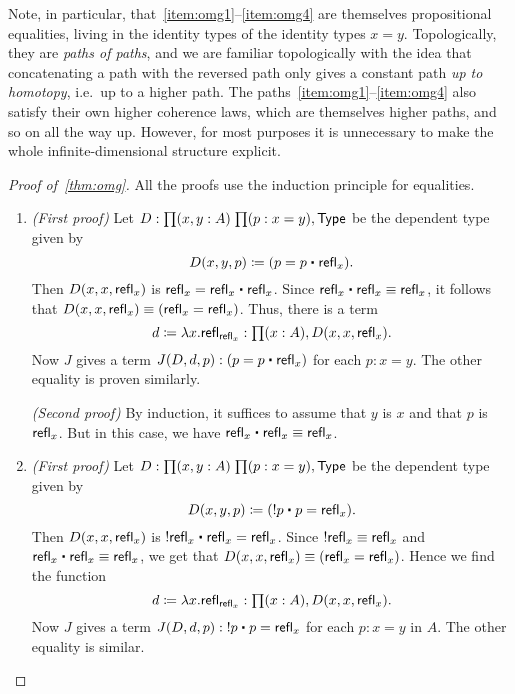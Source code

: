 Note, in particular, that~\ref{item:omg1}--\ref{item:omg4} are themselves propositional equalities, living in the identity types of the identity types $x=y$.
Topologically, they are \emph{paths of paths}, and we are familiar topologically with the idea that concatenating a path with the reversed path only gives a constant path \emph{up to homotopy}, i.e.\ up to a higher path.
The paths~\ref{item:omg1}--\ref{item:omg4} also satisfy their own higher coherence laws, which are themselves higher paths, and so on all the way up.
However, for most purposes it is unnecessary to make the whole infinite-dimensional structure explicit.

\begin{proof}[Proof of~\autoref{thm:omg}]
  All the proofs use the induction principle for equalities.
  \begin{enumerate}
  \item \emph{(First proof)} Let $D:\prd{x,y:A}{p:x=y} \type$ be the dependent type given by 
    \begin{equation*}
      D(x,y,p)\defeq (p= p\ct \refl{x}).
    \end{equation*}
    Then $D(x,x,\mathsf{refl}_{x})$ is $\refl{x}=\refl{x}\ct\refl{x}$.
    Since $\refl{x}\ct\refl{x}\jdeq\refl{x}$, it follows that $D(x,x,\mathsf{refl}_{x})\equiv (\mathsf{refl}_{x}=\mathsf{refl}_{x})$.
    Thus, there is a term
    \begin{equation*}
      d\defeq\lambda x.\refl{\refl{x}}:\prd{x:A} D(x,x,\refl{x}).
    \end{equation*}
    Now $J$ gives a term $J(D,d,p):(p= p\ct\refl{x})$ for each $p:x= y$.
    The other equality is proven similarly.

    \noindent
    \emph{(Second proof)} By induction, it suffices to assume that $y$ is $x$ and that $p$ is $\mathsf{refl}_{x}$.
    But in this case, we have $\refl{x}\ct\refl{x}\jdeq\refl{x}$.
  \item \emph{(First proof)} Let $D:\prd{x,y:A}{p:x=y} \type$ be the dependent type given by 
    \begin{equation*}
      D(x,y,p)\defeq (\opp{p}\ct p=  \refl{x}).
    \end{equation*}
    Then $D(x,x,\mathsf{refl}_{x})$ is $\opp{\refl{x}}\ct\refl{x}=\refl{x}$.
    Since $\mathord{!{\mathsf{refl}_{x}}}\equiv\mathsf{refl}_{x}$ and $\refl{x}\ct\refl{x}\jdeq\refl{x}$, we get that $D(x,x,\mathsf{refl}_{x})\equiv (\mathsf{refl}_{x}=\mathsf{refl}_{x})$.
    Hence we find the function
    \begin{equation*}
      d\defeq\lambda x.\refl{\refl{x}}:\prd{x:A} D(x,x,\refl{x}).
    \end{equation*}
    Now $J$ gives a term $J(D,d,p):\opp{p}\ct p=\refl{x}$ for each $p:x= y$ in $A$.
    The other equality is similar.


\end{enumerate}
\end{proof}
